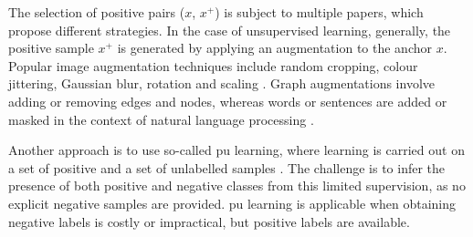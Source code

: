 The selection of positive pairs ($x$, $x^+$) is subject to multiple papers, 
which propose different strategies.
In the case of unsupervised learning, generally, 
the positive sample $x^+$ is generated by applying an augmentation to the anchor $x$.
Popular image augmentation techniques include random cropping, colour jittering, Gaussian blur,
rotation and scaling \citep{adversarial_2020,robinson_contrastive_2021,curricular_weighting_2024}.
Graph augmentations involve adding or removing edges and nodes, 
whereas words or sentences are added or masked in the context of natural language processing 
\citep{curricular_weighting_2024}.

Another approach is to use so-called \ac{pu} learning, where learning is carried out 
on a set of positive and a set of unlabelled samples \citep{chuang_debiased_2020}.
The challenge is to infer the presence of both positive and negative classes from this limited supervision, 
as no explicit negative samples are provided. 
\ac{pu} learning is applicable when obtaining negative labels is costly or impractical, 
but positive labels are available.